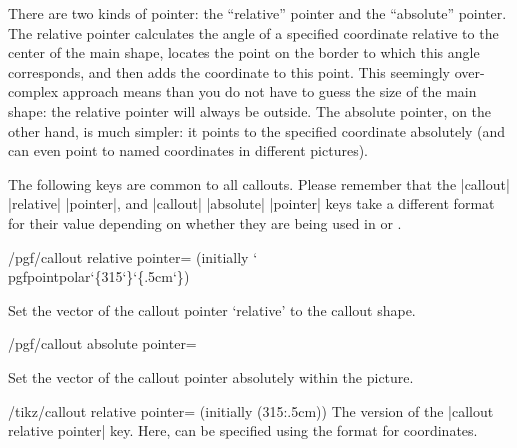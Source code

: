 There are two kinds of pointer:	the ``relative'' pointer and the
``absolute'' pointer.	The relative pointer calculates the angle of a
specified coordinate relative to the center of the main shape, locates
the point on the border to which this angle corresponds, and then adds
the coordinate to this point. This seemingly over-complex approach
means than you do not have to guess the size of the main shape: the
relative pointer will always be outside.
The absolute pointer, on the
other hand, is much simpler: it points to the specified coordinate
absolutely (and can even point to named coordinates in different
pictures).


\begin{codeexample}[]
\end{codeexample}


The following keys are common to all callouts. Please remember
that the |callout| |relative| |pointer|, and |callout| |absolute|
|pointer| keys take a different format for their value depending
on whether they are being used in \pgfname{} or \tikzname{}.


\begin{key}{/pgf/callout relative pointer= (initially {\ttfamily\char`\\pgfpointpolar\char`\{315\char`\}\char`\{.5cm\char`\}})}

  Set the vector of the callout pointer `relative' to the callout
  shape.

\end{key}

\begin{key}{/pgf/callout absolute pointer=}

  Set the vector of the callout pointer absolutely within the picture.

\end{key}



\begin{key}{/tikz/callout relative pointer= (initially {(315:.5cm)})}
	The \tikzname{} version of the |callout relative pointer| key. Here,
	 can be specified using the \tikzname{} format for
	coordinates.
\end{key}

